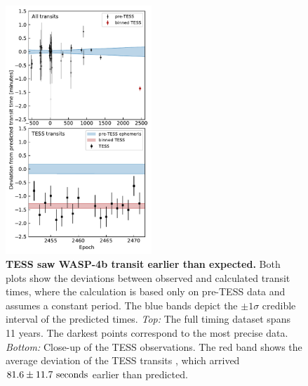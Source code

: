 \documentclass[12pt,twocolumn,tighten]{aastex62}
\begin{document}
\begin{figure}[t]
    \begin{center}
        \leavevmode
        \includegraphics[width=0.49\textwidth]{f3.pdf}
    \end{center}
    \vspace{-0.6cm}
    \caption{ {\bf TESS saw WASP-4b transit earlier than expected.}
      Both plots show the deviations between observed and calculated
      transit times, where the calculation is based only on
       pre-TESS data and assumes a constant period.  The
      blue bands depict the $\pm$$1\sigma$ credible interval of the
      predicted times.  {\it Top:} The full timing dataset spans 11
      years. The darkest points correspond to the most precise data.
        {\it Bottom:} Close-up of the TESS observations. The
      red band shows the average deviation of the TESS transits
      \added{($\pm 1\sigma$)}, which arrived $81.6 \pm 11.7\ {\rm
      seconds}$ earlier than predicted.
      \label{fig:arrived_early}
    }
\end{figure}
\end{document}
